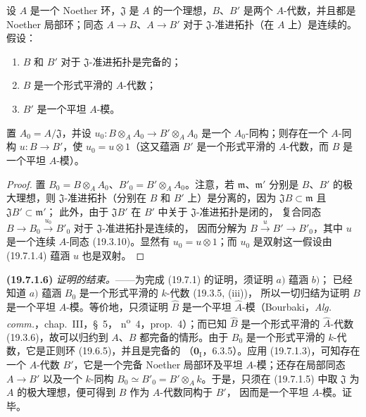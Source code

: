 \begin{lemma}[19.7.1.5]
\label{0.19.7.1.5-fr}
设 $A$ 是一个 Noether 环，$\mathfrak J$ 是 $A$ 的一个理想，$B$、$B'$ 是两个
$A$-代数，并且都是 Noether 局部环；同态 $A\to B$、$A\to B'$ 对于
$\mathfrak J$-准进拓扑（在 $A$ 上）是连续的。假设：
\begin{enumerate}
  \item[$1^{\mathrm o}$] $B$ 和 $B'$ 对于 $\mathfrak J$-准进拓扑是完备的；
  \item[$2^{\mathrm o}$] $B$ 是一个形式平滑的 $A$-代数；
  \item[$3^{\mathrm o}$] $B'$ 是一个平坦 $A$-模。
\end{enumerate}
置 $A_0=A/\mathfrak J$，并设
$u_0:B\otimes_A A_0\to B'\otimes_A A_0$ 是一个 $A_0$-同构；则存在一个
$A$-同构 $u:B\to B'$，使 $u_0=u\otimes1$（这又蕴涵 $B'$ 是一个形式平滑的
$A$-代数，而 $B$ 是一个平坦 $A$-模）。
\end{lemma}

\begin{proof}
置 $B_0=B\otimes_A A_0$、$B'_0=B'\otimes_A A_0$。注意，若
$\mathfrak m$、$\mathfrak m'$ 分别是 $B$、$B'$ 的极大理想，则
$\mathfrak J$-准进拓扑（分别在 $B$ 和 $B'$ 上）是分离的，因为
$\mathfrak JB\subset\mathfrak m$ 且 $\mathfrak JB'\subset\mathfrak m'$；
此外，由于 $\mathfrak JB'$ 在 $B'$ 中关于 $\mathfrak J$-准进拓扑是闭的，
复合同态 $B\to B_0\xrightarrow{u_0}B'_0$ 对于 $\mathfrak J$-准进拓扑是连续的，
因而分解为 $B\xrightarrow{u}B'\to B'_0$，其中 $u$ 是一个连续 $A$-同态
(19.3.10)。显然有 $u_0=u\otimes1$；而 $u_0$ 是双射这一假设由 (19.7.1.4)
蕴涵 $u$ 也是双射。
\end{proof}

\medskip
\noindent\textbf{(19.7.1.6)}\enspace
\emph{证明的结束。}——为完成 (19.7.1) 的证明，须证明 $a)$ 蕴涵 $b)$；
已经知道 $a)$ 蕴涵 $B_0$ 是一个形式平滑的 $k$-代数 (19.3.5, (iii))，
所以一切归结为证明 $B$ 是一个平坦 $A$-模。等价地，只须证明 $\widehat B$
是一个平坦 $\widehat A$-模（Bourbaki，\emph{Alg. comm.}，chap.~III，§~5，
n\textsuperscript{o}~4，prop.~4）；而已知 $\widehat B$ 是一个形式平滑的
$\widehat A$-代数 (19.3.6)，故可以归约到 $A$、$B$ 都完备的情形。由于
$B_0$ 是一个形式平滑的 $k$-代数，它是正则环 (19.6.5)，并且是完备的
（$\mathbf 0_{\mathrm I}$，6.3.5）。应用 (19.7.1.3)，可知存在一个 $A$-代数
$B'$，它是一个完备 Noether 局部环及平坦 $A$-模；还存在局部同态 $A\to B'$
以及一个 $k$-同构 $B_0\simeq B'_0=B'\otimes_A k$。于是，只须在 (19.7.1.5)
中取 $\mathfrak J$ 为 $A$ 的极大理想，便可得到 $B$ 作为 $A$-代数同构于 $B'$，
因而是一个平坦 $A$-模。证毕。

